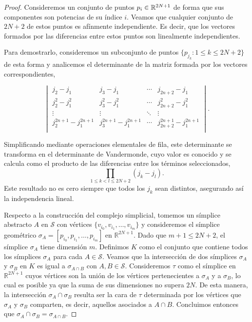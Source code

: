 \begin{proof}
	Consideremos un conjunto de puntos $p_{i}\in \mathbb{R}^{2N+1}$ de forma que sus componentes
	son potencias de su índice $i$. Veamos que cualquier conjunto de $2N+2$ de
	estos puntos es afínmente independiente. Es decir, que los vectores formados
	por las diferencias entre estos puntos son linealmente independientes.
	
	Para demostrarlo, consideremos un subconjunto de puntos $\{p_{j_k}: 1 \leq k \leq
	2N+2\}$ de esta forma y analicemos el determinante de la matriz formada por los
	vectores correspondientes,
	
	\[
	\begin{vmatrix}
		j_{2}- j_{1}               & j_{3}- j_{1}               & \cdots & j_{2n+2}- j_{1}               \\
		j_{2}^{2}- j_{1}^{2}       & j_{3}^{2}- j_{1}^{2}       & \cdots & j_{2n+2}^{2}- j_{1}^{2}       \\
		\vdots                     & \vdots                     & \ddots & \vdots                        \\
		j_{2}^{2n+1}- j_{1}^{2n+1} & j_{3}^{2n+1}- j_{1}^{2n+1} & \cdots & j_{2n+2}^{2n+1}- j_{1}^{2n+1} \\
	\end{vmatrix}
	.
	\]
	
	Simplificando mediante operaciones elementales de fila, este determinante se transforma
	en el determinante de Vandermonde, cuyo valor es conocido y se calcula como el
	producto de las diferencias entre los términos seleccionados,
	\[
	\prod_{1 \leq k < l \leq 2N+2}(j_{k}- j_{l}).
	\]
	Este resultado no es cero siempre que todos los $j_{k}$ sean distintos,
	asegurando así la independencia lineal.
	
	Respecto a la construcción del complejo simplicial, tomemos un símplice abstracto
	$A$ en $\mathcal{S}$ con vértices $\{v_{i_0}, v_{i_1}, \ldots, v_{i_m}\}$ y consideremos
	el símplice geométrico $\sigma_{A}= [p_{i_0}, p_{i_1}, \ldots, p_{i_m}]$ en $\mathbb{R}
	^{2N+1}$. Dado que $m+1 \leq 2N + 2$, el símplice $\sigma_{A}$ tiene dimensión
	$m$. Definimos $K$ como el conjunto que contiene todos los símplices
	$\sigma_{A}$ para cada $A \in \mathcal{S}$. Veamos que la intersección de dos símplices
	$\sigma_{A}$ y $\sigma_{B}$ en $K$ es igual a $\sigma_{A \cap B}$ con $A,B \in
	\mathcal{S}$. Consideremos $\tau$ como el símplice en $\mathbb{R}^{2N+1}$
	cuyos vértices son la unión de los vértices pertenecientes a $\sigma_{A}$ y a
	$\sigma_{B}$, lo cual es posible ya que la suma de sus dimensiones no supera $2
	N$. De esta manera, la intersección $\sigma_{A}\cap \sigma_{B}$ resulta ser la
	cara de $\tau$ determinada por los vértices que $\sigma_{A}$ y $\sigma_{B}$ comparten,
	es decir, aquellos asociados a $A \cap B$. Concluimos entonces que
	$\sigma_{A}\cap \sigma_{B}= \sigma_{A \cap B}$.
\end{proof}

